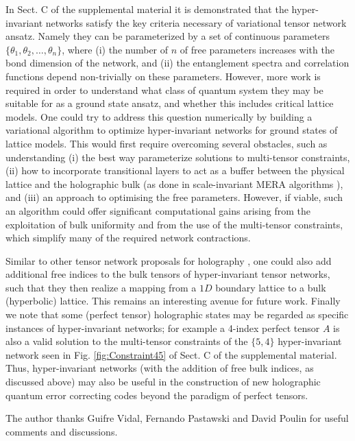 \documentclass[aps,prl,twocolumn,showpacs,superscriptaddress,floatfix,10pt]{revtex4-1}
\begin{document}
In Sect. C of the supplemental material it is demonstrated that the hyper-invariant networks satisfy the key criteria necessary of variational tensor network ansatz. Namely they can be parameterized by a set of continuous parameters $\{\theta_1, \theta_2, \ldots, \theta_n \}$, where (i) the number of $n$ of free parameters increases with the bond dimension of the network, and (ii) the entanglement spectra and correlation functions depend non-trivially on these parameters. However, more work is required in order to understand what class of quantum system they may be suitable for as a ground state ansatz, and whether this includes critical lattice models. One could try to address this question numerically by building a variational algorithm to optimize hyper-invariant networks for ground states of lattice models. This would first require overcoming several obstacles, such as understanding (i) the best way parameterize solutions to multi-tensor constraints, (ii) how to incorporate transitional layers to act as a buffer between the physical lattice and the holographic bulk (as done in scale-invariant MERA algorithms \cite{Pfeifer09, Evenbly11b, Evenbly09}), and (iii) an approach to optimising the free parameters. However, if viable, such an algorithm could offer significant computational gains arising from the exploitation of bulk uniformity and from the use of the multi-tensor constraints, which simplify many of the required network contractions.

Similar to other tensor network proposals for holography \cite{Vidal08,Qi13,Singh17,Pasta15}, one could also add additional free indices to the bulk tensors of hyper-invariant tensor networks, such that they then realize a mapping from a $1D$ boundary lattice to a bulk (hyperbolic) lattice. This remains an interesting avenue for future work. Finally we note that some (perfect tensor) holographic states \cite{Pasta15} may be regarded as specific instances of hyper-invariant networks; for example a 4-index perfect tensor $A$ is also a valid solution to the multi-tensor constraints of the $\{5,4\}$ hyper-invariant network seen in Fig. \ref{fig:Constraint45} of Sect. C of the supplemental material. Thus, hyper-invariant networks (with the addition of free bulk indices, as discussed above) may also be useful in the construction of new holographic quantum error correcting codes beyond the paradigm of perfect tensors.

The author thanks Guifre Vidal, Fernando Pastawski and David Poulin for useful comments and discussions. 
\end{document}
